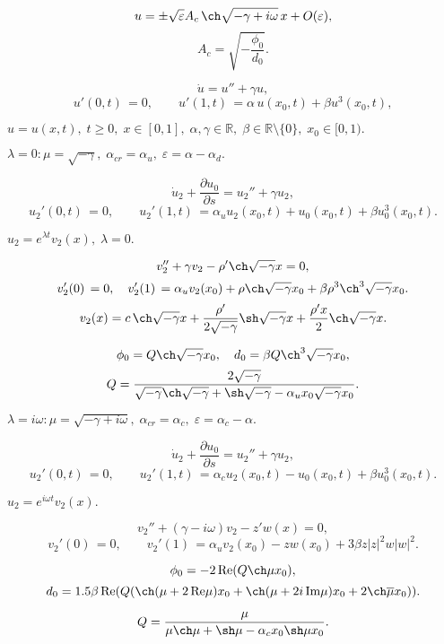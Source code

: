 \documentclass[12pt]{extarticle}
\begin{document}
$$ u = \pm \sqrt{ \varepsilon } A_c \, \ch \sqrt{-\gamma +i \omega} \, x + O(\varepsilon), $$
$$ A_c = \sqrt{-\dfrac{\phi_0}{d_0}}. $$

\newpage

$$ \dot u = u'' + \gamma u, $$
$$ u'(0, t) \, = 0, \qquad u'(1, t) \, = \alpha\,u(x_0, t) + \beta u^3(x_0, t), $$

$ u = u(x, t), \; t \geqslant 0, \; x \in [0, 1], \; \alpha, \gamma \in \mathbb{R}, \; \beta \in \mathbb{R}\setminus\{0\}, \; x_0 \in [0, 1). $

$ \lambda = 0: \mu = \sqrt{-\gamma}, \; \alpha_{cr} = \alpha_u, \; \varepsilon=\alpha-\alpha_d. $

$$	\dot u_2 + \frac{\partial u_0}{\partial s} = u_2'' + \gamma u_2, $$
$$	u_2'(0, t) \, = 0, \qquad u_2'(1, t) \, = \alpha_u u_2(x_0, t) + u_0(x_0, t) + \beta u_0^3(x_0, t). $$

$ u_2 = e^{\lambda t}v_2(x), \; \lambda = 0. $

$$	v_2'' + \gamma v_2 - \rho' \ch \sqrt{-\gamma} x = 0, $$
$$	v_2'(0) \, = 0, \quad v_2'(1) \, = \alpha_u v_2(x_0) + \rho \ch \sqrt{-\gamma} x_0 + \beta \rho^3\ch^3 \sqrt{-\gamma} x_0. $$
$$ v_2(x) = c\,\ch \sqrt{-\gamma} x + \frac{\rho'}{2\sqrt{-\gamma}}\sh\sqrt{-\gamma}x + \frac{\rho'x}{2} \ch\sqrt{-\gamma}x. $$

$$ \phi_0 = Q \ch \sqrt{-\gamma} x_0 , \quad d_0 = \beta Q \ch^3 \sqrt{-\gamma} x_0, $$
$$ Q = \frac{2\sqrt{-\gamma}}{\sqrt{-\gamma}\ch\sqrt{-\gamma} + \sh\sqrt{-\gamma} - \alpha_u x_0 \sqrt{-\gamma} x_0}. $$

$ \lambda = i \omega: \mu = \sqrt{-\gamma + i \omega}, \; \alpha_{cr} = \alpha_c, \; \varepsilon=\alpha_c-\alpha. $

$$	\dot u_2 + \frac{\partial u_0}{\partial s} = u_2'' + \gamma u_2, $$
$$	u_2'(0, t) \, = 0, \qquad u_2'(1, t) \, = \alpha_c u_2(x_0, t) - u_0(x_0, t) + \beta u_0^3(x_0, t). $$

$ u_2 = e^{i \omega t} v_2(x). $

$$	v_2'' + (\gamma - i \omega) v_2 - z' w(x) = 0, $$
$$	v_2'(0) \, = 0, \qquad v_2'(1) \, = \alpha_u v_2(x_0) - z w(x_0) + 3\beta z|z|^2 w|w|^2. $$

$$ \phi_0 = -2 \operatorname{Re} (Q\ch \mu x_0), $$
$$ d_0 = 1.5 \beta \operatorname{Re} (Q ( \ch(\mu + 2\,\mbox{Re}\mu)x_0 + \ch(\mu + 2i\,\mbox{Im}\mu)x_0 + 2\ch\overline{\mu}x_0 )). $$

$$ Q = \frac{\mu}{\mu \ch \mu + \sh \mu - \alpha_c x_0 \sh \mu x_0}. $$

\newpage
\end{document}
